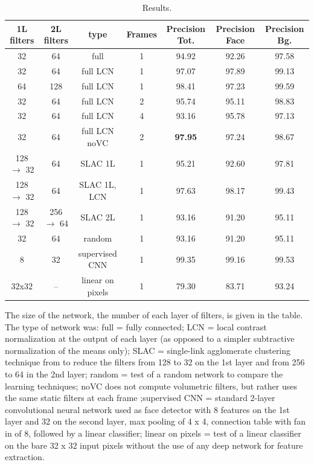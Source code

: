 \documentclass{article} %
\begin{document}
\begin{table}[htdp]
\caption{Results.}
\begin{center}
\begin{tabular}{|c|c|c|c|c|c|c|}
\hline\hline
1L filters	& 2L filters	& type	& Frames	& Precision Tot. & Precision Face  & Precision Bg. \\ 
\hline
32 		& 64 		& full					& 1	& 94.92  		& 92.26		& 97.58  \\
32 		& 64 		& full LCN				& 1	& 97.07 		& 97.89		& 99.13  \\
64		& 128	& full LCN				& 1	& 98.41		& 97.23		& 99.59 \\
32 		& 64 		& full	 LCN				& 2	& 95.74		& 95.11		& 98.83  \\
32 		& 64 		& full LCN				& 4	& 93.16  		& 95.78		& 97.13  \\ 
32 		& 64 		& full LCN noVC	& 2	& \bf{97.95}  	& 97.24		& 98.67  \\ 
128 $\rightarrow$ 32 	& 64 		& SLAC 1L			& 1	& 95.21  		& 92.60		& 97.81  \\
128 $\rightarrow$ 32 	& 64 		& SLAC 1L, LCN		& 1	& 97.63 		& 98.17		& 99.43  \\ 
128 $\rightarrow$ 32 	& 256 $\rightarrow$ 64 	& SLAC 2L		& 1	& 93.16 		& 91.20		& 95.11  \\ 
32 		& 64 		& random				& 1	& 93.16 		& 91.20		& 95.11  \\ 
8 		& 32 		& supervised CNN		& 1	& 99.35 		& 99.16		& 99.53  \\ 
32x32 	& -- 		& linear on pixels		& 1	& 79.30 		& 83.71		& 93.24  \\ 
\hline\hline
\end{tabular}
\end{center}
\label{table1}
\end{table}


The size of the network, the number of each layer of filters,  is given in the table. The type of network was: full = fully connected; LCN = local contrast normalization at the output of each layer (as opposed to a simpler subtractive normalization of the means only); SLAC = single-link agglomerate clustering technique from \cite{coates2012learning} to reduce the filters from 128 to 32 on the 1st layer and from 256 to 64 in the 2nd layer; random = test of a random network to compare the learning techniques; noVC does not compute volumetric filters, but rather uses the same static filters at each frame ;supervised CNN = standard 2-layer convolutional neural network used as face detector with 8 features on the 1st layer and 32 on the second layer, max pooling of 4 x 4, connection table with fan in of 8, followed by a linear classifier; linear on pixels = test of a linear classifier on the bare 32 x 32 input pixels without the use of any deep network for feature extraction.
\end{document}
